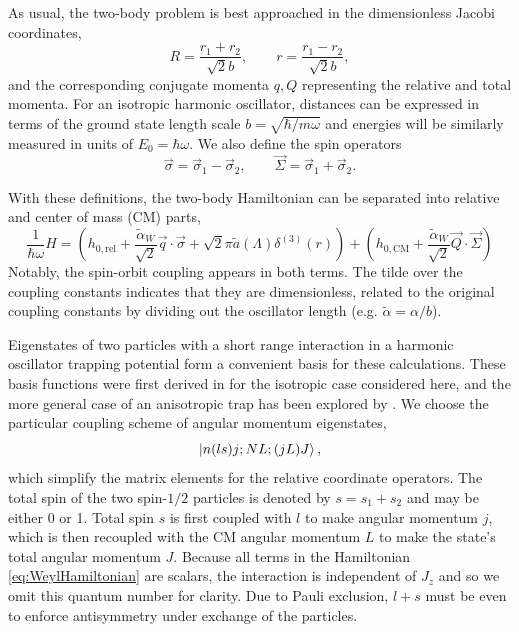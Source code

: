 \documentclass[%
 preprint,
 amsmath,amssymb,
 aps,
]{revtex4-1}
\begin{document}
As usual, the two-body problem is best approached in the dimensionless Jacobi coordinates,
\begin{equation}
R=\frac{r_1+r_2}{\sqrt{2}b}, \qquad r=\frac{r_1-r_2}{\sqrt{2}b},
\end{equation}
and the corresponding conjugate momenta $q,Q$ representing the relative and total momenta. For an isotropic harmonic oscillator, distances can be expressed in terms of the ground state length scale $b=\sqrt{\hbar/m\omega}$ and energies will be similarly measured in units of $E_0=\hbar\omega$. We also define the spin operators
\begin{equation}
\vec{\sigma}=\vec{\sigma}_1-\vec{\sigma}_2, \qquad \vec{\Sigma}=\vec{\sigma}_1+\vec{\sigma}_2.
\end{equation}

With these definitions, the two-body Hamiltonian can be separated into relative and center of mass (CM) parts,
\begin{equation}\label{eq:WeylHamiltonian}
\frac{1}{\hbar\omega}H=\left(h_{0,\text{rel}}+\frac{\tilde{\alpha}_W}{\sqrt{2}} \vec{q}\cdot\vec{\sigma} + \sqrt{2}\pi \tilde{a}(\Lambda) \delta^{(3)}(r)\right)+\left(h_{0,\text{CM}}+\frac{\tilde{\alpha}_W}{\sqrt{2}} \vec{Q}\cdot\vec{\Sigma} \right)
\end{equation}
Notably, the spin-orbit coupling appears in both terms. The tilde over the coupling constants indicates that they are dimensionless, related to the original coupling constants by dividing out the oscillator length (e.g. $\tilde{\alpha}=\alpha/b$).

Eigenstates of two particles with a short range interaction in a harmonic oscillator trapping potential form a convenient basis for these calculations. These basis functions were first derived in \cite{Busch} for the isotropic case considered here, and the more general case of an anisotropic trap has been explored by \cite{PhysRevA.74.022712}. We choose the particular coupling scheme of angular momentum eigenstates,
\begin{equation}\label{eq:basisStates}
\ket{n(ls)j;NL;(jL)J},
\end{equation}
which simplify the matrix elements for the relative coordinate operators. The total spin of the two spin-$1/2$ particles is denoted by $s = s_1 + s_2$ and may be either 0 or 1. Total spin $s$ is first coupled with $l$ to make angular momentum $j$, which is then recoupled with the CM angular momentum $L$ to make the state's total angular momentum $J$. Because all terms in the Hamiltonian \eqref{eq:WeylHamiltonian} are scalars, the interaction is independent of $J_z$ and so we omit this quantum number for clarity. Due to Pauli exclusion, $l + s$ must be even to enforce antisymmetry under exchange of the particles.
\end{document}

